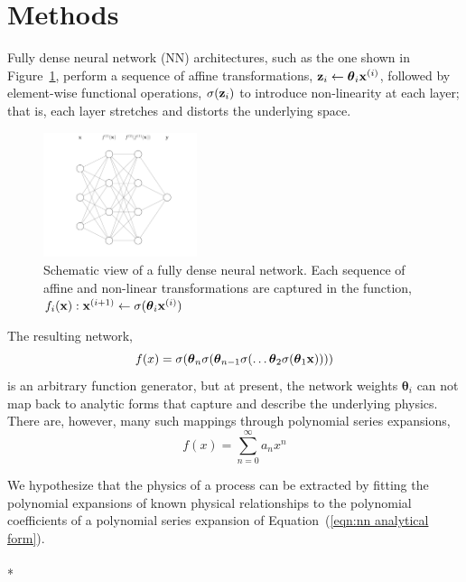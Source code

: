 \section{Methods}\label{methods}

Fully dense neural network (NN) architectures, such as the one shown in Figure~\ref{fig:nn-1}, perform a sequence of affine transformations, ${\bold z}_i \leftarrow \boldsymbol\theta_i {\bold x}^{(i)}$, followed by element-wise functional operations, $\sigma({\bold z}_i)$ to introduce non-linearity at each layer; that is, each layer stretches and distorts the underlying space.
\begin{figure}[htbp]
\begin{center}
\includegraphics[width=0.4\textwidth]{fig/neural-network-01}
\caption{Schematic view of a fully dense neural network. Each sequence of affine and non-linear transformations are captured in the function, $f_i({\bold x}): {\bold x}^{(i+1)} \leftarrow \sigma(\boldsymbol\theta_i {\bold x}^{(i)})$}
\label{fig:nn-1}
\end{center}
\end{figure}

The resulting network,
\begin{equation}
	f(x) = \sigma(\boldsymbol\theta_n \sigma(\boldsymbol\theta_{n-1} \sigma(\ldots \boldsymbol\theta_2 \sigma(\boldsymbol\theta_1{\bold x}))))
	\label{eqn:nn analytical form}
\end{equation}
is an arbitrary function generator, but at present, the network weights $\boldsymbol\theta_i$ can not map back to analytic forms that capture and describe the underlying physics. There are, however, many such mappings through polynomial series expansions,
\begin{equation}
	f(x) = \sum_{n=0}^\infty a_n x^n
\end{equation}

We hypothesize that the physics of a process can be extracted by fitting the polynomial expansions of known physical relationships to the polynomial coefficients of a polynomial series expansion of Equation~(\ref{eqn:nn analytical form}). \\
\\*




